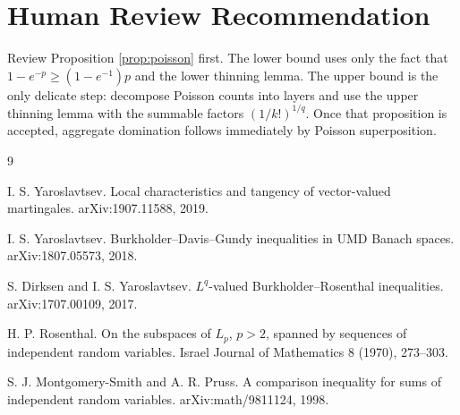 \documentclass[11pt]{article}
\begin{document}
\section*{Human Review Recommendation}

Review Proposition \ref{prop:poisson} first.  The lower bound uses only the
fact that \(1-e^{-p}\ge(1-e^{-1})p\) and the lower thinning lemma.  The upper
bound is the only delicate step: decompose Poisson counts into layers and use
the upper thinning lemma with the summable factors \((1/k!)^{1/q}\).  Once
that proposition is accepted, aggregate domination follows immediately by
Poisson superposition.

\begin{thebibliography}{9}

I. S. Yaroslavtsev.
\newblock Local characteristics and tangency of vector-valued martingales.
\newblock arXiv:1907.11588, 2019.

I. S. Yaroslavtsev.
\newblock Burkholder--Davis--Gundy inequalities in UMD Banach spaces.
\newblock arXiv:1807.05573, 2018.

S. Dirksen and I. S. Yaroslavtsev.
\newblock \(L^q\)-valued Burkholder--Rosenthal inequalities.
\newblock arXiv:1707.00109, 2017.

H. P. Rosenthal.
\newblock On the subspaces of \(L_p\), \(p>2\), spanned by sequences of
  independent random variables.
\newblock Israel Journal of Mathematics 8 (1970), 273--303.

S. J. Montgomery-Smith and A. R. Pruss.
\newblock A comparison inequality for sums of independent random variables.
\newblock arXiv:math/9811124, 1998.

\end{thebibliography}
\end{document}
